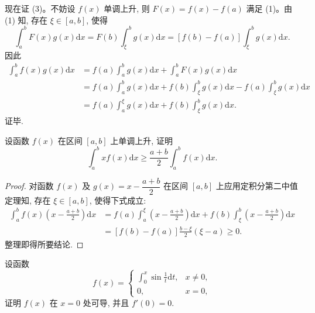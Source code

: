 现在证 (3)。不妨设 $f(x)$ 单调上升, 则 $F(x)=f(x)-f(a)$ 满足 (1)。由 (1) 知, 存在 $\xi\in[a,b]$, 使得
\[
  \int_a^b F(x)g(x)\mathrm dx=F(b)\int_\xi^b g(x)\mathrm dx=[f(b)-f(a)]\int_\xi^b g(x)\mathrm dx.
\]
因此
\[
\begin{aligned}
  \int_a^b f(x)g(x)\mathrm dx
  &=f(a)\int_a^b g(x)\mathrm dx+\int_a^b F(x)g(x)\mathrm dx\\
  &=f(a)\int_a^b g(x)\mathrm dx+f(b)\int_\xi^b g(x)\mathrm dx
  -f(a)\int_\xi^b g(x)\mathrm dx\\
  &=f(a)\int_a^\xi g(x)\mathrm dx+f(b)\int_\xi^b g(x)\mathrm dx.
\end{aligned}
\]
证毕.

\begin{example}\label{example:ma-7-5-2}
设函数 $f(x)$ 在区间 $[a,b]$ 上单调上升, 证明
\[
  \int_a^b xf(x)\mathrm dx\geq\frac{a+b}{2}\int_a^b f(x)\mathrm dx.
\]
\end{example}


\begin{proof}
对函数 $f(x)$ 及 $g(x)=x-\dfrac{a+b}{2}$ 在区间 $[a,b]$ 上应用定积分第二中值定理知, 存在 $\xi\in[a,b]$, 使得下式成立:
\[
\begin{aligned}
  \int_a^b f(x)\left(x-\frac{a+b}{2}\right)\mathrm dx
  &=f(a)\int_a^\xi\left(x-\frac{a+b}{2}\right)\mathrm dx
  +f(b)\int_\xi^b\left(x-\frac{a+b}{2}\right)\mathrm dx\\
  &=[f(b)-f(a)]\frac{b-\xi}{2}(\xi-a)\geq0.
\end{aligned}
\]
整理即得所要结论.
\end{proof}


\begin{example}\label{example:ma-7-5-3}
设函数
\[
  f(x)=
  \begin{cases}
    \displaystyle\int_0^x \sin\frac{1}{t}\mathrm dt, & x\neq0,\\
    0, & x=0,
  \end{cases}
\]
证明 $f(x)$ 在 $x=0$ 处可导, 并且 $f'(0)=0$.
\end{example}


